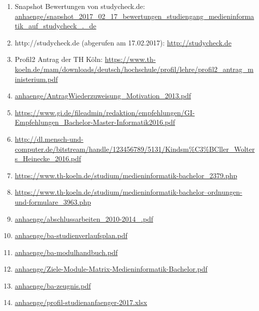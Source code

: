 \documentclass[BCOR12mm,DIV11,titlepage,a4paper,oneside,10pt]{scrbook}
\begin{document}
\begin{sloppypar}
\begin{flushleft}
\begin{enumerate}
\item{Snapshot Bewertungen von studycheck.de: \href{anhaenge/snapshot\_2017\_02\_17\_bewertungen\_studiengang\_medieninformatik\_auf\_studycheck\_.\_de}{anhaenge/snapshot\_2017\_02\_17\_bewertungen\_studiengang\_medieninformatik\_auf\_studycheck\_.\_de} } 
\item{http://studycheck.de (abgerufen am 17.02.2017): \href{http://studycheck.de}{http://studycheck.de} } 
\item{Profil2 Antrag der TH Köln: \href{https://www.th-koeln.de/mam/downloads/deutsch/hochschule/profil/lehre/profil2\_antrag\_ministerium.pdf}{https://www.th-koeln.de/mam/downloads/deutsch/hochschule/profil/lehre/profil2\_antrag\_ministerium.pdf} } 
\item{\href{anhaenge/AntragWiederzuweisung\_Motivation\_2013.pdf}{anhaenge/AntragWiederzuweisung\_Motivation\_2013.pdf} } 
\item{\href{https://www.gi.de/fileadmin/redaktion/empfehlungen/GI-Empfehlungen\_Bachelor-Master-Informatik2016.pdf}{https://www.gi.de/fileadmin/redaktion/empfehlungen/GI-Empfehlungen\_Bachelor-Master-Informatik2016.pdf} } 
\item{\href{http://dl.mensch-und-computer.de/bitstream/handle/123456789/5131/Kindsm\%C3\%BCller\_Wolters\_Heinecke\_2016.pdf}{http://dl.mensch-und-computer.de/bitstream/handle/123456789/5131/Kindsm\%C3\%BCller\_Wolters\_Heinecke\_2016.pdf} } 
\item{\href{https://www.th-koeln.de/studium/medieninformatik-bachelor\_2379.php}{https://www.th-koeln.de/studium/medieninformatik-bachelor\_2379.php} } 
\item{\href{https://www.th-koeln.de/studium/medieninformatik-bachelor--ordnungen-und-formulare\_3963.php}{https://www.th-koeln.de/studium/medieninformatik-bachelor--ordnungen-und-formulare\_3963.php} } 
\item{\href{anhaenge/abschlussarbeiten\_2010-2014\_.pdf}{anhaenge/abschlussarbeiten\_2010-2014\_.pdf} } 
\item{\href{anhaenge/ba-studienverlaufsplan.pdf}{anhaenge/ba-studienverlaufsplan.pdf} } 
\item{\href{anhaenge/ba-modulhandbuch.pdf}{anhaenge/ba-modulhandbuch.pdf} } 
\item{\href{anhaenge/Ziele-Module-Matrix-Medieninformatik-Bachelor.pdf}{anhaenge/Ziele-Module-Matrix-Medieninformatik-Bachelor.pdf} } 
\item{\href{anhaenge/ba-zeugnis.pdf}{anhaenge/ba-zeugnis.pdf} } 
\item{\href{anhaenge/profil-studienanfaenger-2017.xlsx}{anhaenge/profil-studienanfaenger-2017.xlsx} } 

\end{enumerate}
\end{flushleft}
\end{sloppypar}
\end{document}

